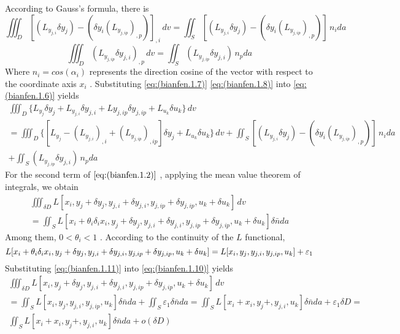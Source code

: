 According to Gauss's formula, there is
\begin{equation} \label{eq:(bianfen.1.7)}
\iiint_D [\left(L_{y_{j,i}} \delta y_j \right) -\left(\delta y_{i} \left(L_{y_{j,ip}}\right)_{,p}\right)]_{,i}\,dv
=\iint_S [\left(L_{y_{j,i}} \delta y_j \right) -\left(\delta y_{i} \left(L_{y_{j,ip}}\right)_{,p}\right)]\,n_i da
\end{equation} 
\begin{equation} \label{eq:(bianfen.1.8)}
\iiint_D \left(L_{y_{j,ip}} \delta y_{j,i} \right)_{,p}\,dv
=\iint_S \left(L_{y_{j,ip}} \delta y_{j,i} \right)\,n_p da
\end{equation} 
Where $ n_i=cos (\alpha_i) $ represents the direction cosine of the vector with respect to the coordinate axis $ x_i $ .
Substituting \ref{eq:(bianfen.1.7)} \ref{eq:(bianfen.1.8)} into \ref{eq:(bianfen.1.6)} yields
\begin{multline} \label{eq:(bianfen.1.9)}
\iiint_D \{L_{y_j} \delta y_j + L_{y_{j,i}} \delta y_{j,i}+L{y_{j,ip} \delta y_{j,ip}+L_{u_k} \delta u_k
}\} \,dv 
\\=\iiint_D \{[L_{y_j} - \left(L_{y_{j,i}}\right)_{,i}+\left(L_{y_{j,ip}}\right)_{,ip}]\delta y_j+L_{u_k} \delta u_k\} \,dv +\iint_S [\left(L_{y_{j,i}} \delta y_j \right) -\left(\delta y_{i} \left(L_{y_{j,ip}}\right)_{,p}\right)]\,n_i da
\\+\iint_S \left(L_{y_{j,ip}} \delta y_{j,i} \right)\,n_p da
\end{multline} 
For the second term of $ \ref{eq:(bianfen.1.2)}$  , applying the mean value theorem of integrals, we obtain
\begin{multline} \label{eq:(bianfen.1.10)}
\iiint_{\delta D} L[x_i,y_j+\delta y_j,y_{j,i}+\delta y_{j,i},y_{j,ip}+\delta y_{j, ip},u_k+\delta u_k] \,dv 
\\=\iint_S L[x_i+\theta_i \delta_i x_i,y_j+\delta y_j,y_{j,i}+\delta y_{j,i},y_{j,ip}+\delta y_{j,ip},u_k+\delta u_k]\delta \bar{n} da
\end{multline} 
Among them, $ 0<\theta_i<1 $ . According to the continuity of the $ L$  functional,
\begin{equation} \label{eq:(bianfen.1.11)}    
L[x_i+\theta_i \delta_i x_i,y_j+\delta y_j,y_{j,i}+\delta y_{j,i},y_{j,ip}+\delta y_{j,ip},u_k+\delta u_k]
\\=L[x_i,y_j,y_{j,i},y_{j, ip},u_k]+\varepsilon_1
\end{equation} 
Substituting \ref{eq:(bianfen.1.11)} into \ref{eq:(bianfen.1.10)} yields
\begin{multline} \label{eq:(bianfen.1.12)}    
\iiint_{\delta D} L[x_i,y_j+\delta y_j,y_{j,i}+\delta y_{j,i},y_{j,ip}+\delta y_{j, ip},u_k+\delta u_k] \,dv 
\\=\iint_{S} L[x_i,y_j,y_{j,i},y_{j,ip},u_k]\delta \bar{n} da+\iint_{S} \varepsilon_1 \delta \bar{n} da
=\iint_{S} L[x_i+ x_i,y_j+,y_{j,i},u_k]\delta \bar{n} da+\varepsilon_1 \delta D
=\\\iint_{S} L[x_i+ x_i,y_j+,y_{j,i},u_k]\delta \bar{n} da+o(\delta D)
\end{multline} 
